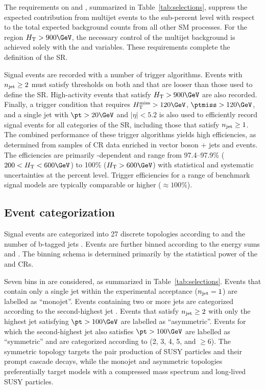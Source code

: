 The requirements on \alphat and \bdphi, summarized in
Table~\ref{tab:selections}, suppress the expected contribution from
multijet events to the sub-percent level with respect to the total
expected background counts from all other SM processes. For the region
$\scalht > 900\GeV$, the necessary control of the multijet background
is achieved solely with the \bdphi and \bdphimod variables. These
requirements complete the definition of the SR.

Signal events are recorded with a number of trigger algorithms. Events
with $n_{\text{jet}} \geq 2$ must satisfy thresholds on both \scalht and
\alphat that are looser than those used to define the
SR. High-activity events that satisfy $\scalht > 900\GeV$ are also
recorded. Finally, a trigger condition that requires $\mht > 120\GeV$,
$\ptmiss > 120\GeV$, and a single jet with $\pt > 20\GeV$ and $|\eta|
< 5.2$ is also used to efficiently record signal events for all
categories of the SR, including those that satisfy $n_{\text{jet}} \geq 1$. The
combined performance of these trigger algorithms yields high
efficiencies, as determined from samples of CR data enriched in vector
boson + jets and \ttbar events. The efficiencies are primarily
\scalht-dependent and range from 97.4--97.9\% ($200 < \scalht <
600\GeV$) to 100\% ($\scalht > 600\GeV$) with statistical and
systematic uncertainties at the percent level. Trigger efficiencies
for a range of benchmark signal models are typically comparable or
higher (${\approx}100\%$).

\subsection{Event categorization}
\label{sec:categorization}

Signal events are categorized into 27 discrete topologies according to
\njet and the number of b-tagged jets \nb. Events are further binned
according to the energy sums \scalht and \mht. The binning schema is
determined primarily by the statistical power of the \mj and \mmj CRs.

Seven bins in \njet are considered, as summarized in
Table~\ref{tab:selections}. Events that contain only a single jet
within the experimental acceptance ($n_{\text{jet}} = 1$) are labelled as
``monojet''. Events containing two or more jets are categorized
according to the second-highest jet \pt. Events that satisfy $n_{\text{jet}}
\geq 2$ with only the highest \pt jet satisfying $\pt > 100\GeV$ are
labelled as ``asymmetric''. Events for which the second-highest jet
\pt also satisfies $\pt > 100\GeV$ are labelled as ``symmetric'' and
are categorized according to \njet (2, 3, 4, 5, and ${\geq}6$). The
symmetric topology targets the pair production of SUSY particles and
their prompt cascade decays, while the monojet and asymmetric
topologies preferentially target models with a compressed mass
spectrum and long-lived SUSY particles.

